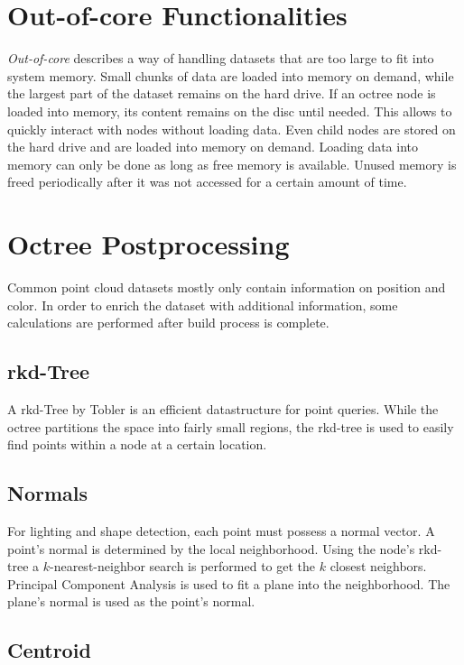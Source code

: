 \section{Out-of-core Functionalities}

\textit{Out-of-core} describes a way of handling datasets that are too large to fit into system memory. Small chunks of data are loaded into memory on demand, while the largest part of the dataset remains on the hard drive. If an octree node is loaded into memory, its content remains on the disc until needed. This allows to quickly interact with nodes without loading data. Even child nodes are stored on the hard drive and are loaded into memory on demand. 
Loading data into memory can only be done as long as free memory is available. Unused memory is freed periodically after it was not accessed for a certain amount of time. 


\section{Octree Postprocessing}

Common point cloud datasets mostly only contain information on position and color. In order to enrich the dataset with additional information, some calculations are performed after build process is complete. 


\subsection{rkd-Tree}

A rkd-Tree by Tobler\cite{tobler2011rkd} is an efficient datastructure for point queries. While the octree partitions the space into fairly small regions, the rkd-tree is used to easily find points within a node at a certain location. 


\subsection{Normals}

For lighting and shape detection, each point must possess a normal vector. A point's normal is determined by the local neighborhood. Using the node's rkd-tree a $k$-nearest-neighbor search is performed to get the $k$ closest neighbors. Principal Component Analysis\cite{jolliffe2002principal} is used to fit a plane into the neighborhood. The plane's normal is used as the point's normal.


\subsection{Centroid}

